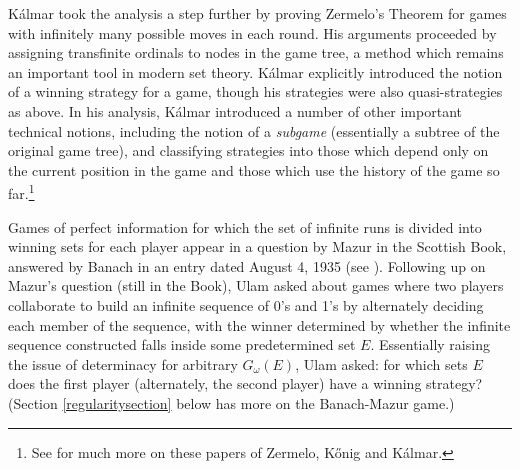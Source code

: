 \documentclass{book}%
\begin{document}

K\'{a}lmar  took the analysis a step further by
proving Zermelo's Theorem for games with infinitely many possible
moves in each round. His arguments proceeded by assigning transfinite ordinals
to nodes in the game tree, a method which remains an important tool in modern set theory.
K\'{a}lmar explicitly introduced the notion of
a winning strategy for a game, though his strategies were also quasi-strategies
as above. In his analysis,
K\'{a}lmar introduced a number of other important technical notions,
including the notion of a \emph{subgame} (essentially a subtree of
the original game tree), and classifying strategies into those which
depend only on the current position in the game and those which use
the history of the game so far.\footnote{See \cite{SchwalbeWalker:2001} for
much more on these papers of Zermelo,
K\H{o}nig  and K\'{a}lmar.}



Games of perfect information for which the set of infinite runs is
divided into winning sets for each player appear in a question by Mazur in the Scottish
Book, answered by Banach in an entry dated August 4, 1935   (see \cite[p.~113]{Mauldin:Scottish}).
Following up on Mazur's question (still in the Book), Ulam asked about games where two
players collaborate to build an infinite sequence of 0's and 1's by
alternately deciding each member of the sequence, with the winner
determined by whether the infinite sequence constructed falls inside
some predetermined set $E$.
Essentially raising
the issue of determinacy for arbitrary $G_{\omega}(E)$, Ulam asked:
for which sets $E$ does the first player (alternately, the second
player) have a winning strategy? (Section \ref{regularitysection} below has more on
the Banach-Mazur game.)
\end{document}
